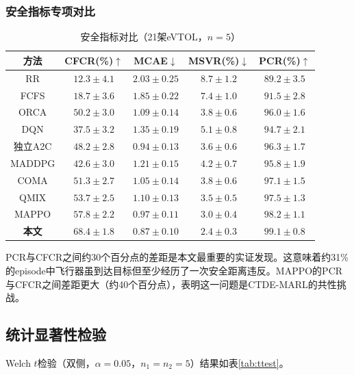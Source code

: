 \documentclass[12pt,a4paper,UTF8]{ctexart}
\begin{document}
\subsubsection{安全指标专项对比}

\begin{table}[H]
    \centering
    \caption{安全指标对比（21架eVTOL，$n=5$）}
    \label{tab:safety}
    \begin{tabular}{|c|c|c|c|c|}
        \hline
        \textbf{方法} & \textbf{CFCR(\%)$\uparrow$} & \textbf{MCAE$\downarrow$} & \textbf{MSVR(\%)$\downarrow$} & \textbf{PCR(\%)$\uparrow$} \\
        \hline
        RR & $12.3\pm4.1$ & $2.03\pm0.25$ & $8.7\pm1.2$ & $89.2\pm3.5$ \\
        FCFS & $18.7\pm3.6$ & $1.85\pm0.22$ & $7.4\pm1.0$ & $91.5\pm2.8$ \\
        ORCA & $50.2\pm3.0$ & $1.09\pm0.14$ & $3.8\pm0.6$ & $96.0\pm1.6$ \\
        DQN & $37.5\pm3.2$ & $1.35\pm0.19$ & $5.1\pm0.8$ & $94.7\pm2.1$ \\
        独立A2C & $48.2\pm2.8$ & $0.94\pm0.13$ & $3.6\pm0.6$ & $96.3\pm1.7$ \\
        MADDPG & $42.6\pm3.0$ & $1.21\pm0.15$ & $4.2\pm0.7$ & $95.8\pm1.9$ \\
        COMA & $51.3\pm2.7$ & $1.05\pm0.14$ & $3.8\pm0.6$ & $97.1\pm1.5$ \\
        QMIX & $53.7\pm2.5$ & $1.10\pm0.13$ & $3.5\pm0.5$ & $97.5\pm1.3$ \\
        MAPPO & $57.8\pm2.2$ & $0.97\pm0.11$ & $3.0\pm0.4$ & $98.2\pm1.1$ \\
        \textbf{本文} & $\mathbf{68.4\pm1.8}$ & $\mathbf{0.87\pm0.10}$ & $\mathbf{2.4\pm0.3}$ & $\mathbf{99.1\pm0.8}$ \\
        \hline
    \end{tabular}
\end{table}

PCR与CFCR之间约30个百分点的差距是本文最重要的实证发现。这意味着约31\%的episode中飞行器虽到达目标但至少经历了一次安全距离违反。MAPPO的PCR与CFCR之间差距更大（约40个百分点），表明这一问题是CTDE-MARL的共性挑战。

\subsection{统计显著性检验}

Welch $t$检验（双侧，$\alpha=0.05$，$n_1=n_2=5$）结果如表\ref{tab:ttest}。
\end{document}
